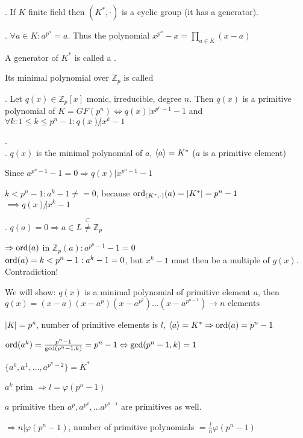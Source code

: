 \Theorem.
If $K$ finite field then $(K^{*},\cdot)$ is a cyclic group (it has a generator).

\Corollary.
$\forall a \in K: a^{p^n} = a$. Thus the polynomial $x^{p^n} -x = \prod_{a\in K}(x-a)$

\begin{definition}
  A generator of $K^{*}$ is called a .

  Its minimal polynomial over $\mathbb{Z}_p$ is called 
\end{definition}

\Theorem.
Let $q(x) \in \mathbb{Z}_p[x]$ monic, irreducible, degree $n$. Then $q(x)$ is a primitive polynomial of $K = GF(p^n) \iff q(x) | x^{p^n -1}-1$ and $\forall k : 1 \leq k \leq p^n-1: q(x) \not| x^k-1$

\Proof. \\
\ProofForward.
$q(x)$ is the minimal polynomial of $a$, $\left\langle a \right\rangle = K^{*}$ ($a$ is a primitive element)

Since $a^{p^n-1}-1 = 0 \Rightarrow q(x)|x^{p^n-1}-1$

$k < p^n-1: a^k -1 \neq = 0$, because $\operatorname{ord}_{(K^{*}, \cdot)} (a) = | K^{*}| = p^n-1$ \\
$\implies q(x) \not| x^k -1$

\ProofBackward.
$q(a) = 0 \Rightarrow a \in L \stackrel{\subset}{\neq} \mathbb{Z}_p$

$\Rightarrow \operatorname{ord}(a)$ in $\mathbb{Z}_p(a): a^{p^n-1}-1 = 0$ \\
$\operatorname{ord}(a) = k < p^n -1: a^k -1 = 0$, but $x^k-1$ must then be a multiple of $g(x)$. Contradiction!


We will show: $q(x)$ is a minimal polynomial of primitive element $a$, then $q(x) = (x- a)(x-a^p)(x-a^{p^2}) \ldots (x-a^{p^{n-1}}) \rightarrow n \text{ elements}$

$|K| = p^n$, number of primitive elements is $l$, $\left\langle a \right\rangle = K^{*} \Rightarrow \operatorname{ord}(a) = p^n-1$

$\operatorname{ord}(a^k) = \frac{p^n-1}{\gcd(p^n-1,k)} = p^n-1 \Leftrightarrow \gcd(p^n-1,k) = 1$

$\{a^0, a^1, \ldots, a^{p^n-2}\} = K^{*}$

$a^k$ prim $\Rightarrow l = \varphi(p^n-1)$

$a$ primitive then $a^p, a^{p^2}, \ldots a^{p^{n-1}}$ are primitives as well.

$\Rightarrow n| \varphi(p^n-1)$, number of primitive polynomials $= \frac{l}{n} \varphi(p^n-1)$

